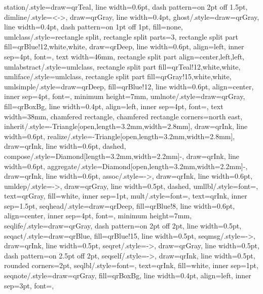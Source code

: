 {  station/.style={draw=qrTeal, line width=0.6pt, dash pattern=on 2pt off 1.5pt},
  dimline/.style={<->, draw=qrGray, line width=0.4pt},
  ghost/.style={draw=qrGray, line width=0.4pt, dash pattern=on 1pt off 1pt, fill=none},
  umlclass/.style={rectangle split, rectangle split parts=3,
              rectangle split part fill={qrBlue!12,white,white},
              draw=qrDeep, line width=0.6pt, align=left, inner sep=4pt,
              font=\sffamily\footnotesize, text width=46mm,
              rectangle split part align={center,left,left}},
  umlabstract/.style={umlclass,
              rectangle split part fill={qrTeal!12,white,white}},
  umliface/.style={umlclass,
              rectangle split part fill={qrGray!15,white,white}},
  umlsimple/.style={draw=qrDeep, fill=qrBlue!12, line width=0.6pt, align=center,
              inner sep=4pt, font=\sffamily\footnotesize, minimum height=7mm},
  umlnote/.style={draw=qrGray, fill=qrBoxBg, line width=0.4pt, align=left,
              inner sep=4pt, font=\sffamily\scriptsize, text width=38mm,
              chamfered rectangle, chamfered rectangle corners=north east},
  inherit/.style={-{Triangle[open,length=3.2mm,width=2.8mm]},
              draw=qrInk, line width=0.6pt},
  realize/.style={-{Triangle[open,length=3.2mm,width=2.8mm]},
              draw=qrInk, line width=0.6pt, dashed},
  compose/.style={{Diamond[length=3.2mm,width=2.2mm]}-,
              draw=qrInk, line width=0.6pt},
  aggregate/.style={{Diamond[open,length=3.2mm,width=2.2mm]}-,
              draw=qrInk, line width=0.6pt},
  assoc/.style={->, draw=qrInk, line width=0.6pt},
  umldep/.style={->, draw=qrGray, line width=0.5pt, dashed},
  umllbl/.style={font=\sffamily\scriptsize, text=qrGray, fill=white, inner sep=1pt},
  mult/.style={font=\sffamily\scriptsize, text=qrInk, inner sep=1.5pt},
  seqhead/.style={draw=qrDeep, fill=qrBlue!8, line width=0.6pt, align=center,
              inner sep=4pt, font=\sffamily\footnotesize, minimum height=7mm},
  seqlife/.style={draw=qrGray, dash pattern=on 2pt off 2pt, line width=0.5pt},
  seqact/.style={draw=qrBlue, fill=qrBlue!15, line width=0.5pt},
  seqmsg/.style={->, draw=qrInk, line width=0.5pt},
  seqret/.style={->, draw=qrGray, line width=0.5pt, dash pattern=on 2.5pt off 2pt},
  seqself/.style={->, draw=qrInk, line width=0.5pt, rounded corners=2pt},
  seqlbl/.style={font=\sffamily\scriptsize, text=qrInk, fill=white, inner sep=1pt},
  seqnote/.style={draw=qrGray, fill=qrBoxBg, line width=0.4pt, align=left,
              inner sep=3pt, font=\sffamily\scriptsize},
}

\newcommand{\titledbox}[3]{%
  \node[draw=#3,rounded corners=3pt,line width=0.6pt,fill=#3!5,
        fit=#1,inner sep=7pt,label={[anchor=north west,font=\sffamily\bfseries\small,
        text=#3,xshift=2pt,yshift=-1pt]north west:#2}] {};}
